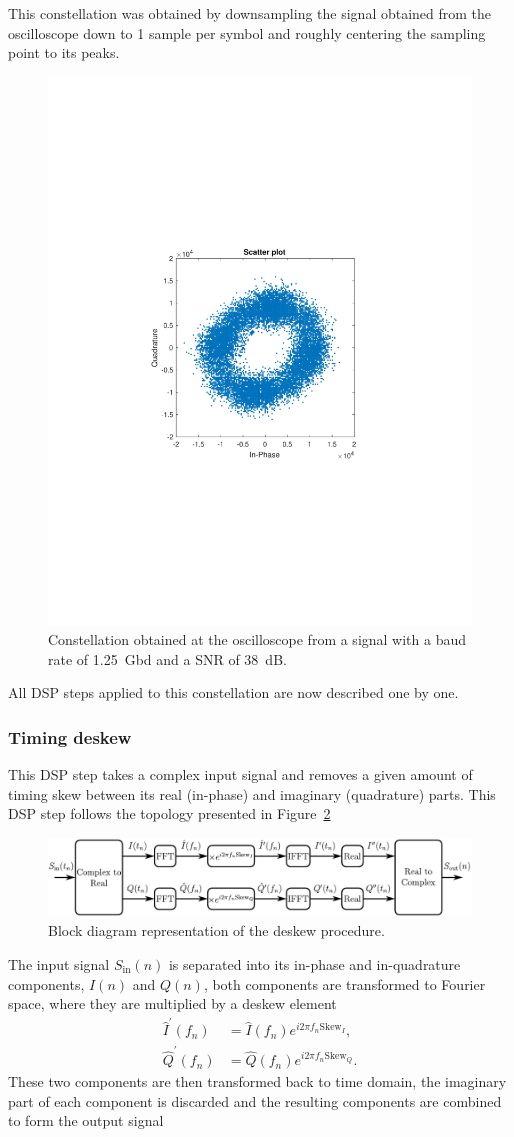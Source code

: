 This constellation was obtained by downsampling the signal obtained from the oscilloscope down to 1 sample per symbol and roughly centering the sampling point to its peaks.
%
\begin{figure}[h]
\centering
\includegraphics[trim={7cm 8cm 7cm 8cm},width=.4\linewidth]{./sdf/m_qam_system/figures/DSP_section/initialConstellation}
\caption{Constellation obtained at the oscilloscope from a signal with a baud rate of 1.25~Gbd and a SNR of 38~dB.}
\label{fig:inConstellation_DSP}
\end{figure}	
%
All DSP steps applied to this constellation are now described one by one.

\subsubsection{Timing deskew}

This DSP step takes a complex input signal and removes a given amount of timing skew between its real (in-phase) and imaginary (quadrature) parts. This DSP step follows the topology presented in Figure~\ref{fig:mqamDiagramDSP_DS}
%
\begin{figure}[h]
\centering
\includegraphics[width=\linewidth]{./sdf/m_qam_system/figures/DSP_section/diagramDSP_DS}
\caption{Block diagram representation of the deskew procedure.}
\label{fig:mqamDiagramDSP_DS}
\end{figure}
%
The input signal $S_\text{in}(n)$ is separated into its in-phase and in-quadrature components, $I(n)$ and $Q(n)$, both components are transformed to Fourier space, where they are multiplied by a deskew element
%
\begin{align}
\hat{I}^\prime(f_n)&=\hat{I}(f_n) e^{i2\pi f_n \text{Skew}_I},\\
\hat{Q}^\prime(f_n)&=\hat{Q}(f_n) e^{i2\pi f_n \text{Skew}_Q}.
\end{align}
%
These two components are then transformed back to time domain, the imaginary part of each component is discarded and the resulting components are combined to form the output signal

